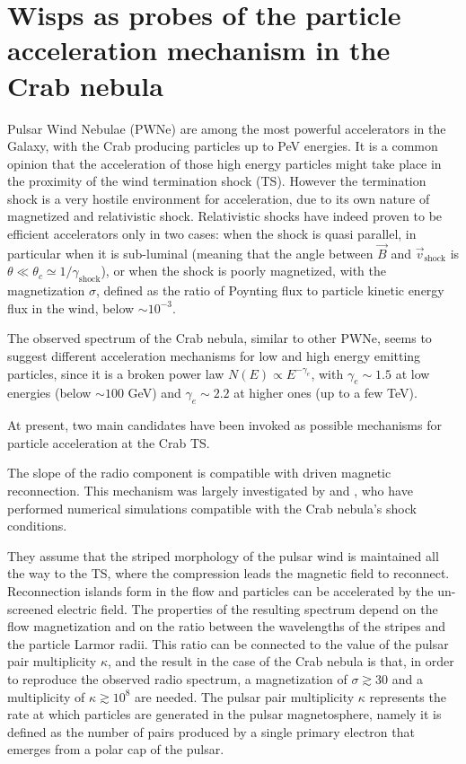 \section{Wisps as probes of the particle acceleration mechanism in the Crab nebula}
\label{sec:wisps}
Pulsar Wind Nebulae (PWNe) are among the most powerful accelerators in the Galaxy, with the Crab producing particles up to PeV energies. 
It is a common opinion that the acceleration of those high energy particles might take place in the proximity of the wind termination shock (TS). However the termination shock is a very hostile environment for acceleration, due to its own nature of magnetized and relativistic shock. 
Relativistic shocks have indeed proven to be efficient accelerators only in two cases: when the shock is quasi parallel, in particular when it is sub-luminal (meaning that the angle between $\vec{B}$ and $\vec{v}_\mathrm{shock}$ is $\theta\ll\theta_c\simeq 1/\gamma_\mathrm{shock}$), or when the shock is poorly magnetized, with the magnetization $\sigma$, defined as the ratio of Poynting flux to particle kinetic energy flux in the wind, below $\sim 10^{-3}$.

The observed spectrum of the Crab nebula, similar to other PWNe, seems to suggest different acceleration mechanisms for low and high energy emitting particles, since it is a broken power law $N(E)\propto E^{-\gamma_e}$, with $\gamma_e\sim 1.5$ at low energies (below $\sim 100$ GeV) and $\gamma_e\sim 2.2$ at higher ones (up to a few TeV).

At present, two main candidates have been invoked as possible mechanisms for particle acceleration at the Crab TS.

The slope of the radio component is compatible with driven magnetic reconnection. 
This mechanism was largely investigated by \citet{Sironi:2011} and \citet{Sironi:2013}, who have performed numerical simulations compatible with the Crab nebula's shock conditions. 

They assume that the striped morphology of the pulsar wind is maintained all the way to the TS, where the compression leads the magnetic field to reconnect. 
Reconnection islands form in the flow and particles can be accelerated by the un-screened electric field. 
The properties of the resulting spectrum depend on the flow magnetization and on the ratio between the wavelengths of the stripes and the particle Larmor radii. 
This ratio can be connected to the value of the pulsar pair multiplicity $\kappa$, and the result in the case of the Crab nebula is that, in order to reproduce the observed radio spectrum, a magnetization of $\sigma\gtrsim 30$ and a multiplicity of $\kappa \gtrsim 10^8$ are needed. The pulsar pair multiplicity $\kappa$ represents the rate at which particles are generated in the pulsar magnetosphere, namely it is defined as the number of pairs produced by a single primary electron that emerges from a polar cap of the pulsar. 

